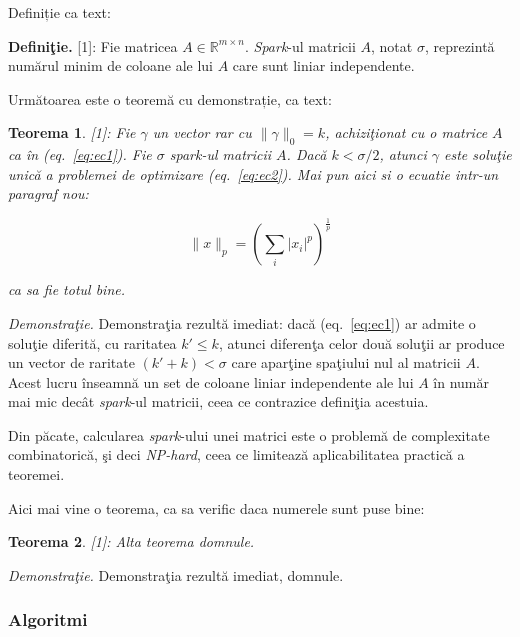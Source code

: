 \documentclass[]{article}
\newtheorem{theorem}{Teorema}
\begin{document}
Definiție ca text:

\textbf{Definiţie.} {[}1{]}: Fie matricea
\(A \in \mathbb{R}^{m \times n}\). \emph{Spark}-ul matricii \(A\), notat
\(\sigma\), reprezintă numărul minim de coloane ale lui \(A\) care sunt
liniar independente.

Următoarea este o teoremă cu demonstrație, ca text:

\begin{theorem}

{[}1{]}: Fie \(\gamma\) un vector rar cu \(\|\gamma\|_0 = k\),
achiziţionat cu o matrice \(A\) ca în (eq.~\ref{eq:ec1}). Fie \(\sigma\)
\emph{spark}-ul matricii \(A\). Dacă \(k < \sigma / 2\), atunci
\(\gamma\) este soluţie unică a problemei de optimizare
(eq.~\ref{eq:ec2}). Mai pun aici si o ecuatie intr-un paragraf nou:

\begin{equation}
 \|x\|_p = \left( \sum_i |x_i|^p \right) ^\frac{1}{p}
\label{eq:ec1}\end{equation}

ca sa fie totul bine.

\end{theorem}

\emph{Demonstraţie.} Demonstraţia rezultă imediat: dacă
(eq.~\ref{eq:ec1}) ar admite o soluţie diferită, cu raritatea
\(k' \leq k\), atunci diferenţa celor două soluţii ar produce un vector
de raritate \((k'+k) < \sigma\) care aparţine spaţiului nul al matricii
\(A\). Acest lucru înseamnă un set de coloane liniar independente ale
lui \(A\) în număr mai mic decât \emph{spark}-ul matricii, ceea ce
contrazice definiţia acestuia.

Din păcate, calcularea \emph{spark}-ului unei matrici este o problemă de
complexitate combinatorică, şi deci \emph{NP-hard}, ceea ce limitează
aplicabilitatea practică a teoremei.

Aici mai vine o teorema, ca sa verific daca numerele sunt puse bine:

\begin{theorem}

{[}1{]}: Alta teorema domnule.

\end{theorem}

\emph{Demonstraţie.} Demonstraţia rezultă imediat, domnule.

\subsubsection{Algoritmi}\label{algoritmi}
\end{document}

